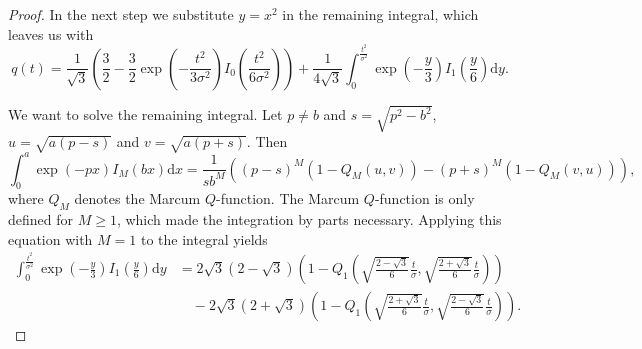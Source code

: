 \documentclass[a4paper,12pt]{article}
\theoremstyle{plain}
\theoremstyle{definition}
\numberwithin{equation}{section}
\begin{document}
\begin{proof}
	In the next step we substitute $y = x^2$ in the remaining integral, which leaves us with
	\begin{equation*}
		q(t) = \frac{1}{\sqrt{3}} \left( \frac{3}{2} - \frac{3}{2} \exp \left( - \frac{t^2}{3 \sigma^2} \right) I_0 \left( \frac{t^2}{6 \sigma^2} \right) \right) + \frac{1}{4 \sqrt{3}} \int_0^\frac{t^2}{\sigma^2} \exp \left( - \frac{y}{3} \right) I_1 \left( \frac{y}{6} \right) \mathrm{d}y.
	\end{equation*}
	
	We want to solve the remaining integral. Let $p \neq b$ and $s = \sqrt{p^2 - b^2}$, $u = \sqrt{a (p - s)}$ and $v = \sqrt{a (p + s)}$. Then \cite{IntQFunction}
	\begin{equation}\label{eq: intmarcum}
		\int_0^a \exp(-p x) I_M ( b x ) \mathrm{d}x = \frac{1}{s b^M} \left( (p - s)^M ( 1 - Q_M(u, v) ) - (p + s)^M ( 1 - Q_M(v, u) ) \right),
	\end{equation}
	where $Q_M$ denotes the Marcum $Q$-function. The Marcum $Q$-function is only defined for $M \geq 1$, which made the integration by parts necessary. Applying this equation with $M = 1$ to the integral yields
	\begin{align*}
		\int_0^\frac{t^2}{\sigma^2} \exp \left( - \frac{y}{3} \right) I_1 \left( \frac{y}{6} \right) \mathrm{d}y &= 2 \sqrt{3} (2 - \sqrt{3}) \left( 1 - Q_1 \left( \sqrt{\frac{2 - \sqrt{3}}{6}} \frac{t}{\sigma}, \sqrt{\frac{2 + \sqrt{3}}{6}} \frac{t}{\sigma} \right) \right) \\
		&\quad - 2 \sqrt{3} (2 + \sqrt{3}) \left( 1 - Q_1 \left( \sqrt{\frac{2 + \sqrt{3}}{6}} \frac{t}{\sigma}, \sqrt{\frac{2 - \sqrt{3}}{6}} \frac{t}{\sigma} \right) \right).
	\end{align*}
	

\end{proof}
\end{document}
